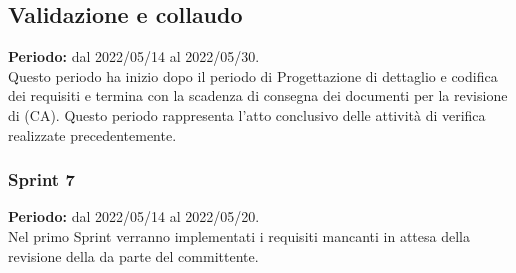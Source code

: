 
\subsection{Validazione e collaudo} \label{subsection:pianificazione_validazione}
\textbf{Periodo:} dal 2022/05/14 al 2022/05/30.
\bigskip
\\Questo periodo ha inizio dopo il periodo di Progettazione di dettaglio e codifica dei requisiti e termina con la scadenza di consegna dei documenti per la revisione di \CA{} (CA\glo{}).
Questo periodo rappresenta l'atto conclusivo delle attività di verifica realizzate precedentemente.
\subsubsection{Sprint 7} \label{subsubsection:sprint_7}
\textbf{Periodo:} dal 2022/05/14 al 2022/05/20.
\bigskip
\\Nel primo Sprint\glo{} verranno implementati i requisiti mancanti in attesa della revisione della \PB{} da parte del committente.
